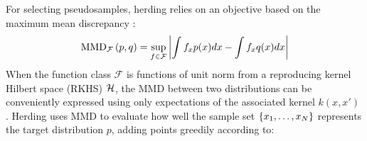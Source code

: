 \documentclass[]{article}
\begin{document}
For selecting pseudosamples, herding relies on an objective based on the maximum mean discrepancy \citep[MMD;\ ][]{Sriperumbudur2010}: %
%
\begin{align}
	{\rm MMD}_{\mathcal{F}}\left(p,q\right) = \sup_{f\in\mathcal{F}}\left\vert\int f_x p(x) dx - \int f_x q(x) dx \right\vert
\end{align}
%
%
When the function class $\mathcal{F}$ is functions of unit norm from a reproducing kernel Hilbert space (RKHS) $\mathcal{H}$, the MMD between two distributions can be conveniently expressed using only expectations of the associated kernel $k(x, x')$ \citep{Sriperumbudur2010}.
%
%
%
Herding uses MMD to evaluate how well the sample set $\{{x}_1,\ldots,{x}_{N}\}$ represents the target distribution $p$, adding points greedily according to:
%
\end{document}
